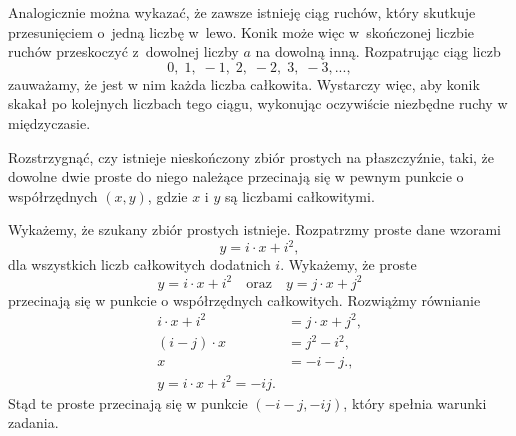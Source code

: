 \vspace{10px}
\noindent
Analogicznie można wykazać, że zawsze istnieję ciąg ruchów, który skutkuje przesunięciem o~jedną liczbę w~lewo. Konik może więc w~skończonej liczbie ruchów przeskoczyć z~dowolnej liczby $a$ na dowolną inną. Rozpatrując ciąg liczb
\[
	0, \; 1, \; -1, \; 2, \; -2, \; 3, \; -3, ...,
\]
zauważamy, że jest w nim każda liczba całkowita. Wystarczy więc, aby konik skakał po kolejnych liczbach tego ciągu, wykonując oczywiście niezbędne ruchy w międzyczasie.

\begin{problem}{6}
	Rozstrzygnąć, czy istnieje nieskończony zbiór prostych na płaszczyźnie, taki, że dowolne dwie proste do niego należące przecinają się w pewnym punkcie o współrzędnych $(x, y)$, gdzie $x$ i $y$ są liczbami całkowitymi.
\end{problem}

\noindent
Wykażemy, że szukany zbiór prostych istnieje.
Rozpatrzmy proste dane wzorami
\[
	y = i \cdot x + i^2,
\]
dla wszystkich liczb całkowitych dodatnich $i$. Wykażemy, że proste
\[
	y = i \cdot x + i^2 \quad \text{oraz} \quad y = j \cdot x + j^2
\]
przecinają się w punkcie o współrzędnych całkowitych. Rozwiążmy równianie
\begin{align*}
	i \cdot x + i^2 &= j \cdot x + j^2, \\
	(i - j) \cdot x &= j^2 - i^2, \\
	x &= - i - j.
	, \\
	y = i \cdot x + i^2 = -ij.
\end{align*} 
Stąd te proste przecinają się w punkcie $(-i - j, -ij)$, który spełnia warunki zadania.

